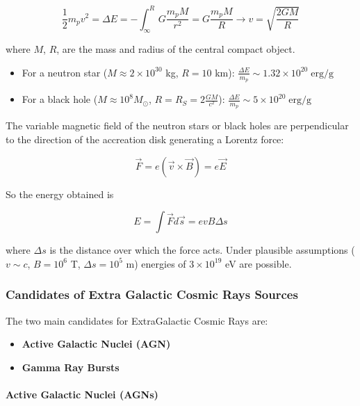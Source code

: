 \documentclass[
  letterpaper,
  DIV=11,
  numbers=noendperiod]{scrreprt}
\let\oldparagraph\paragraph
\renewcommand{\paragraph}[1]{\oldparagraph{#1}\mbox{}}
\providecommand{\tightlist}{%
  \setlength{\itemsep}{0pt}\setlength{\parskip}{0pt}}\usepackage{longtable,booktabs,array}
\begin{document}
\[\frac{1}{2}m_p v^2 = \Delta E = -\int^{R}_\infty G\frac{m_p M}{r^2} = G\frac{m_p M}{R}  \rightarrow v =\sqrt{\frac{2 GM}{R}}\]

where \(M\), \(R\), are the mass and radius of the central compact
object.

\begin{itemize}
\item
  For a neutron star (\(M\approx 2\times10^{30}\) kg, \(R= 10\) km):
  \(\frac{\Delta E}{m_p} \sim 1.32\times 10^{20} \;\mathrm{erg/g}\)
\item
  For a black hole (\(M\approx 10^8 M_\odot\),
  \(R = R_S = 2\frac{GM}{c^2}\)):
  \(\frac{\Delta E}{m_p} \sim 5 \times 10^{20} \;\mathrm{erg/g}\)
\end{itemize}

The variable magnetic field of the neutron stars or black holes are
perpendicular to the direction of the accreation disk generating a
Lorentz force:

\[\vec{F} = e (\vec{v} \times \vec{B}) = e\vec{E}\]

So the energy obtained is

\[E=\int \vec{F}d\vec{s} = e v B\Delta s\]

where \(\Delta s\) is the distance over which the force acts. Under
plausible assumptions (\(v \sim c\), \(B= 10^6\) T, \(\Delta s = 10^5\)
m) energies of \(3\times 10^{19}\) eV are possible.

\subsubsection{Candidates of Extra Galactic Cosmic Rays
Sources}\label{candidates-of-extra-galactic-cosmic-rays-sources}

The two main candidates for ExtraGalactic Cosmic Rays are:

\begin{itemize}
\tightlist
\item
  \textbf{Active Galactic Nuclei (AGN)}
\item
  \textbf{Gamma Ray Bursts}
\end{itemize}

\paragraph{Active Galactic Nuclei
(AGNs)}\label{active-galactic-nuclei-agns}
\end{document}
